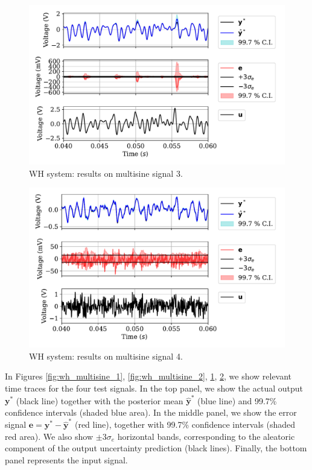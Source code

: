 \documentclass{ifacconf}
\newcommand{\tvec}[1]{{\mathbf{#1}}}
\newcommand{\mean}[1]{\hat{#1}}
\begin{document}
\begin{figure}%
 \centering
 \includegraphics[width=.99\linewidth]{img/MULTISINE_3.pdf}
 \caption{WH system: results on multisine signal 3.}
 \label{fig:wh_multisine_3}
\end{figure}

\begin{figure}%
 \centering
 \includegraphics[width=.99\linewidth]{img/MULTISINE_4.pdf}
 \caption{WH system: results on multisine signal 4.}
 \label{fig:wh_multisine_4}
\end{figure}

In Figures \ref{fig:wh_multisine_1}, \ref{fig:wh_multisine_2}, \ref{fig:wh_multisine_3}, \ref{fig:wh_multisine_4}, we show relevant time traces for the four test signals. In the top panel, we show the actual output $\tvec{y}^*$ (black line) together with the posterior mean $\mean{\tvec{y}}^*$ (blue line) and 99.7\% confidence intervals (shaded blue area). In the middle panel, we show the error signal $\tvec{e}= \tvec{y}^*-\mean{\tvec{y}}^*$ (red line), together with 99.7\% confidence intervals (shaded red area). We also show  $\pm 3 \sigma_e$ horizontal bands, corresponding to the aleatoric component of the output uncertainty prediction (black lines). Finally, the bottom panel represents the input signal. 
\end{document}
